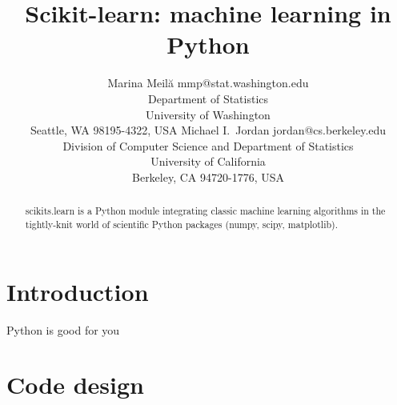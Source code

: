 \documentclass[twoside,11pt]{article}
\begin{document}
\title{Scikit-learn: machine learning in Python}


\author{\name Marina Meil\u{a} \email mmp@stat.washington.edu \\
       \addr Department of Statistics\\
       University of Washington\\
       Seattle, WA 98195-4322, USA
       \AND
       \name Michael I.\ Jordan \email jordan@cs.berkeley.edu \\
       \addr Division of Computer Science and Department of Statistics\\
       University of California\\
       Berkeley, CA 94720-1776, USA}



\maketitle

\begin{abstract}
scikits.learn is a Python module integrating classic machine learning
algorithms in the tightly-knit world of scientific Python packages
(numpy, scipy, matplotlib).
\end{abstract}




\section{Introduction}

Python is good for you

\section{Code design}
\end{document}
